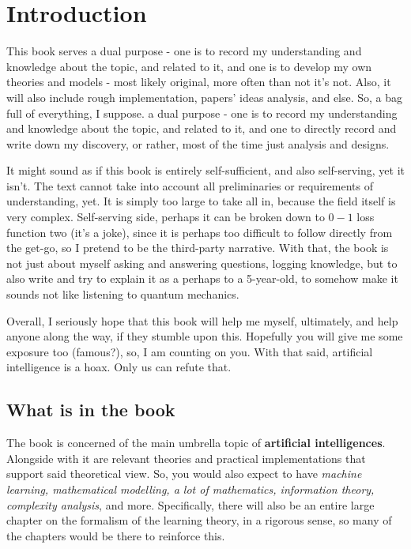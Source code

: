 \chapter{Introduction}

This book serves a dual purpose - one is to record my understanding and knowledge about the topic, and related to it, and one is to develop my own theories and models - most likely original, more often than not it's not. Also, it will also include rough implementation, papers' ideas analysis, and else. So, a bag full of everything, I suppose.  a dual purpose - one is to record my understanding and knowledge about the topic, and related to it, and one to directly record and write down my discovery, or rather, most of the time just analysis and designs. 

It might sound as if this book is entirely self-sufficient, and also self-serving, yet it isn't. The text cannot take into account all preliminaries or requirements of understanding, yet. It is simply too large to take all in, because the field itself is very complex. Self-serving side, perhaps it can be broken down to $0-1$ loss function two (it's a joke), since it is perhaps too difficult to follow directly from the get-go, so I pretend to be the third-party narrative. With that, the book is not just about myself asking and answering questions, logging knowledge, but to also write and try to explain it as a perhaps to a 5-year-old, to somehow make it sounds not like listening to quantum mechanics. 

Overall, I seriously hope that this book will help me myself, ultimately, and help anyone along the way, if they stumble upon this. Hopefully you will give me some exposure too (famous?), so, I am counting on you. With that said, artificial intelligence is a hoax. Only us can refute that. 

\section{What is in the book}
The book is concerned of the main umbrella topic of \textbf{artificial intelligences}. Alongside with it are relevant theories and practical implementations that support said theoretical view. So, you would also expect to have \textit{machine learning, mathematical modelling, a lot of mathematics, information theory, complexity analysis}, and more. Specifically, there will also be an entire large chapter on the formalism of the learning theory, in a rigorous sense, so many of the chapters would be there to reinforce this. 

